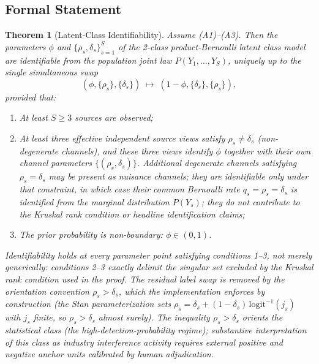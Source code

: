 \documentclass[11pt,a4paper]{article}
\newtheorem{theorem}{Theorem}
\begin{document}
\subsection{Formal Statement}
\begin{theorem}[Latent-Class Identifiability]
Assume (A1)--(A3). Then the parameters $\phi$ and $\{\rho_s, \delta_s\}_{s=1}^{S}$ of the 2-class product-Bernoulli latent class model are identifiable from the population joint law $P(Y_1, \dots, Y_S)$, uniquely up to the single simultaneous swap %
\[
(\phi, \{\rho_s\}, \{\delta_s\}) \;\longmapsto\; (1 - \phi, \{\delta_s\}, \{\rho_s\}), %
\]
provided that:
\begin{enumerate}
    \item At least $S \ge 3$ sources are observed;
    \item At least three effective independent source views satisfy $\rho_s \neq \delta_s$ (non-degenerate channels), and these three views identify $\phi$ together with their own channel parameters $\{(\rho_s, \delta_s)\}$. Additional degenerate channels satisfying $\rho_s = \delta_s$ may be present as nuisance channels; they are identifiable only under that constraint, in which case their common Bernoulli rate $q_s = \rho_s = \delta_s$ is identified from the marginal distribution $P(Y_s)$; they do not contribute to the Kruskal rank condition or headline identification claims; %
    \item The prior probability is non-boundary: $\phi \in (0, 1)$.
\end{enumerate}
Identifiability holds at \emph{every} parameter point satisfying conditions 1--3, not merely generically: conditions 2--3 exactly delimit the singular set excluded by the Kruskal rank condition used in the proof. The residual label swap is removed by the orientation convention $\rho_s > \delta_s$, which the implementation enforces by construction (the Stan parameterization sets $\rho_s = \delta_s + (1 - \delta_s)\,\mathrm{logit}^{-1}(j_s)$ with $j_s$ finite, so $\rho_s > \delta_s$ almost surely). The inequality $\rho_s > \delta_s$ orients the statistical class (the high-detection-probability regime); substantive interpretation of this class as industry interference activity requires external positive and negative anchor units calibrated by human adjudication. %
\end{theorem}
\end{document}
